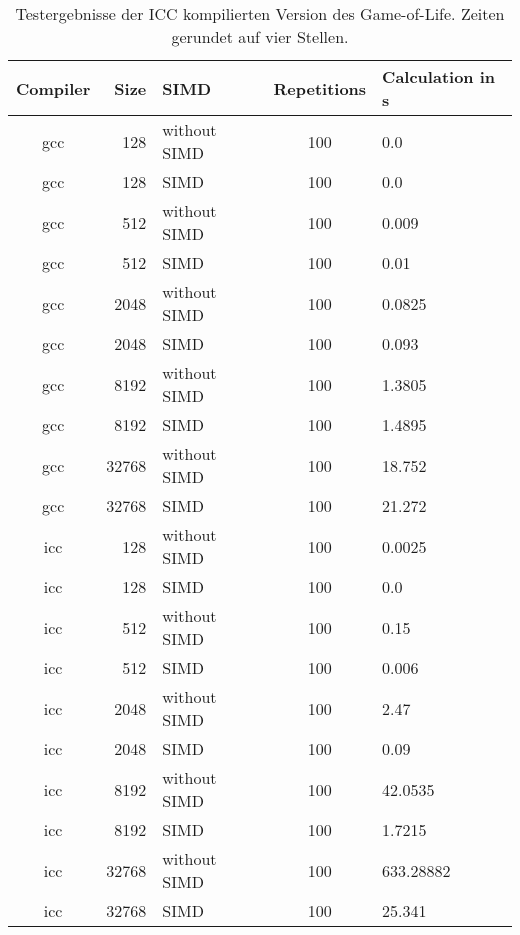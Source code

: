 \documentclass[german,plainarticle,hyperref,utf8]{zihpub}
\begin{document}
	\begin{table}
		\begin{center}
			\begin{tabular}{||c r l c l||}
				\hline
				Compiler & Size  & SIMD & Repetitions & Calculation in s \\ [1ex]
				\hline\hline
				gcc & 128   & without SIMD & 100 & 0.0       \\ \hline
				gcc & 128   & SIMD         & 100 & 0.0       \\ \hline
				gcc & 512   & without SIMD & 100 & 0.009     \\ \hline
				gcc & 512   & SIMD         & 100 & 0.01      \\ \hline
				gcc & 2048  & without SIMD & 100 & 0.0825    \\ \hline
				gcc & 2048  & SIMD         & 100 & 0.093     \\ \hline
				gcc & 8192  & without SIMD & 100 & 1.3805    \\ \hline
				gcc & 8192  & SIMD         & 100 & 1.4895    \\ \hline
				gcc & 32768 & without SIMD & 100 & 18.752    \\ \hline
				gcc & 32768 & SIMD         & 100 & 21.272    \\ \hline \hline
				icc & 128   & without SIMD & 100 & 0.0025    \\ \hline
				icc & 128   & SIMD         & 100 & 0.0       \\ \hline
				icc & 512   & without SIMD & 100 & 0.15      \\ \hline
				icc & 512   & SIMD         & 100 & 0.006     \\ \hline
				icc & 2048  & without SIMD & 100 & 2.47      \\ \hline
				icc & 2048  & SIMD         & 100 & 0.09      \\ \hline
				icc & 8192  & without SIMD & 100 & 42.0535   \\ \hline
				icc & 8192  & SIMD         & 100 & 1.7215    \\ \hline
				icc & 32768 & without SIMD & 100 & 633.28882 \\ \hline
				icc & 32768 & SIMD         & 100 & 25.341    \\ \hline
			\end{tabular}
			\caption{\label{tab:calc}Testergebnisse der ICC kompilierten Version des Game-of-Life. Zeiten gerundet auf vier Stellen.}
		\end{center}
	\end{table}
	\clearpage
	
\end{document}
